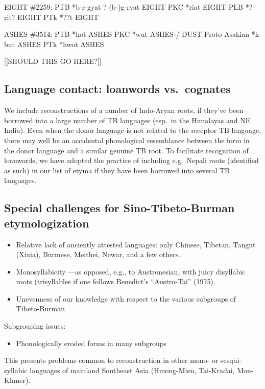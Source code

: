EIGHT
\#2259: PTB *b-r-gyat ? (b-)g-ryat EIGHT
PKC *riat EIGHT
PLB *?-rit? EIGHT
PTk *??t EIGHT

ASHES
\#3514: PTB *hot ASHES
PKC *wut ASHES / DUST
Proto-Asakian *k-but ASHES	
PTk *hwot ASHES

[[SHOULD THIS GO HERE?]]

\subsection{Language contact: loanwords vs.\ cognates}

We include reconstructions of a number of Indo-Aryan roots, if they've been borrowed into a large number of TB languages (esp.\ in the Himalayas and NE India).
Even when the donor language is not related to the receptor TB language, there may well be an accidental phonological resemblance between the form in the donor language and a similar genuine TB root. To facilitate recognition of loanwords, we have adopted the practice of including e.g.\ Nepali roots (identified as such) in our list of etyma if they have been borrowed into several TB languages.

\subsection{Special challenges for Sino-Tibeto-Burman etymologization}

\begin{itemize}
\item Relative lack of anciently attested languages: only Chinese, Tibetan, Tangut (Xixia), Burmese, Meithei, Newar, and a few others.
\item Monosyllabicity	—as opposed, e.g., to Austronesian, with juicy disyllabic roots (trisyllables if one follows Benedict’s “Austro-Tai” (1975).
\item Unevenness of our knowledge with respect to the various subgroups of Tibeto-Burman
\end{itemize}

Subgrouping issues: 

\begin{itemize}
\item Phonologically eroded forms in many subgroups 
\end{itemize}

This presents problems common to reconstruction in other mono- or sesqui-syllabic languages of mainland Southeast Asia (Hmong-Mien, Tai-Kradai, Mon-Khmer).
	
